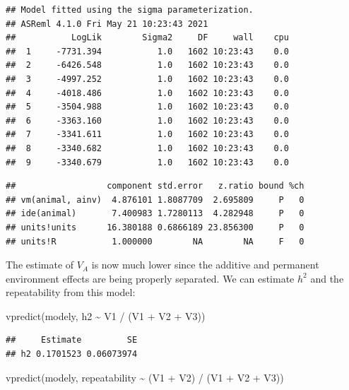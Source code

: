 \documentclass[
  12pt,
]{book}
\newenvironment{Shaded}{\begin{snugshade}}{\end{snugshade}}
\newcommand{\FunctionTok}[1]{\textcolor[rgb]{0.00,0.00,0.00}{#1}}
\newcommand{\NormalTok}[1]{#1}
\newcommand{\SpecialCharTok}[1]{\textcolor[rgb]{0.00,0.00,0.00}{#1}}
\begin{document}
\begin{verbatim}
## Model fitted using the sigma parameterization.
## ASReml 4.1.0 Fri May 21 10:23:43 2021
##           LogLik        Sigma2     DF     wall    cpu
##  1     -7731.394           1.0   1602 10:23:43    0.0
##  2     -6426.548           1.0   1602 10:23:43    0.0
##  3     -4997.252           1.0   1602 10:23:43    0.0
##  4     -4018.486           1.0   1602 10:23:43    0.0
##  5     -3504.988           1.0   1602 10:23:43    0.0
##  6     -3363.160           1.0   1602 10:23:43    0.0
##  7     -3341.611           1.0   1602 10:23:43    0.0
##  8     -3340.682           1.0   1602 10:23:43    0.0
##  9     -3340.679           1.0   1602 10:23:43    0.0
\end{verbatim}

\begin{Shaded}
\end{Shaded}

\begin{verbatim}
##                  component std.error   z.ratio bound %ch
## vm(animal, ainv)  4.876101 1.8087709  2.695809     P   0
## ide(animal)       7.400983 1.7280113  4.282948     P   0
## units!units      16.380188 0.6866189 23.856300     P   0
## units!R           1.000000        NA        NA     F   0
\end{verbatim}

The estimate of \(V_A\) is now much lower since the additive and permanent environment effects are being properly separated. We can estimate \(h^2\) and the repeatability from this model:

\begin{Shaded}
\begin{Highlighting}[]
\FunctionTok{vpredict}\NormalTok{(modely, h2 }\SpecialCharTok{\textasciitilde{}}\NormalTok{ V1 }\SpecialCharTok{/}\NormalTok{ (V1 }\SpecialCharTok{+}\NormalTok{ V2 }\SpecialCharTok{+}\NormalTok{ V3))}
\end{Highlighting}
\end{Shaded}

\begin{verbatim}
##     Estimate         SE
## h2 0.1701523 0.06073974
\end{verbatim}

\begin{Shaded}
\begin{Highlighting}[]
\FunctionTok{vpredict}\NormalTok{(modely, repeatability }\SpecialCharTok{\textasciitilde{}}\NormalTok{ (V1 }\SpecialCharTok{+}\NormalTok{ V2) }\SpecialCharTok{/}\NormalTok{ (V1 }\SpecialCharTok{+}\NormalTok{ V2 }\SpecialCharTok{+}\NormalTok{ V3))}
\end{Highlighting}
\end{Shaded}
\end{document}
